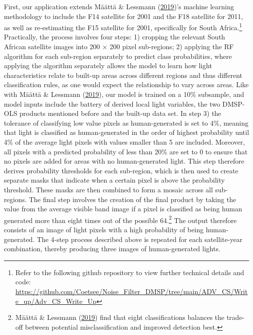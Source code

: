 \documentclass[11pt,preprint, authoryear]{elsarticle}
\numberwithin{equation}{section}
\numberwithin{figure}{section}
\numberwithin{table}{section}
\let\rmarkdownfootnote\footnote%
\def\footnote{\protect\rmarkdownfootnote}
\begin{document}
First, our application extends Määttä \& Lessmann
(\protect\hyperlink{ref-maatta}{2019})'s machine learning methodology to
include the F14 satellite for 2001 and the F18 satellite for 2011, as
well as re-estimating the F15 satellite for 2001, specifically for South
Africa.\footnote{Refer to the following github repository to view
  further technical details and code:
  \url{https://github.com/Coetsee/Noise_Filter_DMSP/tree/main/ADV_CS/Write_up/Adv_CS_Write_Up}}
Practically, the process involves four steps: 1) cropping the relevant
South African satellite images into 200 × 200 pixel sub-regions; 2)
applying the RF algorithm for each sub-region separately to predict
class probabilities, where applying the algorithm separately allows the
model to learn how light characteristics relate to built-up areas across
different regions and thus different classification rules, as one would
expect the relationship to vary across areas. Like with Määttä \&
Lessmann (\protect\hyperlink{ref-maatta}{2019}), our model is trained on
a 10\% subsample, and model inputs include the battery of derived local
light variables, the two DMSP-OLS products mentioned before and the
built-up data set. In step 3) the tolerance of classifying low value
pixels as human-generated is set to 4\%, meaning that light is
classified as human-generated in the order of highest probability until
4\% of the average light pixels with values smaller than 5 are included.
Moreover, all pixels with a predicted probability of less than 20\% are
set to 0 to ensure that no pixels are added for areas with no
human-generated light. This step therefore derives probability
thresholds for each sub-region, which is then used to create separate
masks that indicate when a certain pixel is above the probability
threshold. These masks are then combined to form a mosaic across all
sub-regions. The final step involves the creation of the final product
by taking the value from the average visible band image if a pixel is
classified as being human generated more than eight times out of the
possible 64.\footnote{Määttä \& Lessmann
  (\protect\hyperlink{ref-maatta}{2019}) find that eight classifications
  balances the trade-off between potential misclassification and
  improved detection best.} The output therefore consists of an image of
light pixels with a high probability of being human-generated. The
4-step process described above is repeated for each satellite-year
combination, thereby producing three images of human-generated lights.
\end{document}
